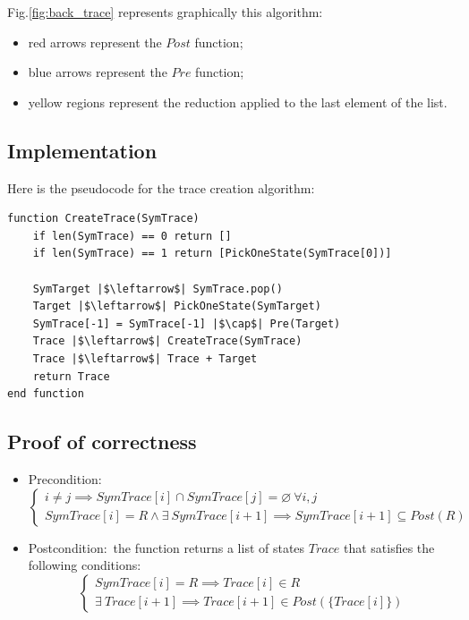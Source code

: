 \documentclass[12pt]{article}
\begin{document}
    Fig.\ref{fig:back_trace} represents graphically this algorithm:
    \begin{itemize}
        \item red arrows represent the $Post$ function;
        \item blue arrows represent the $Pre$ function;
        \item yellow regions represent the reduction applied to the last element of the list.
    \end{itemize}

    \subsection{Implementation}
    Here is the pseudocode for the trace creation algorithm:
    \begin{verbatim}
function CreateTrace(SymTrace)
    if len(SymTrace) == 0 return []
    if len(SymTrace) == 1 return [PickOneState(SymTrace[0])]

    SymTarget |$\leftarrow$| SymTrace.pop()
    Target |$\leftarrow$| PickOneState(SymTarget)
    SymTrace[-1] = SymTrace[-1] |$\cap$| Pre(Target)
    Trace |$\leftarrow$| CreateTrace(SymTrace)
    Trace |$\leftarrow$| Trace + Target
    return Trace
end function
    \end{verbatim}
    
    \subsection{Proof of correctness}
    \begin{itemize}
        \item Precondition:
        \begin{equation}
            \begin{cases}
                i \neq j \implies SymTrace[i] \cap SymTrace[j] = \varnothing\ \forall i, j \\
                SymTrace[i] = R \wedge \exists\ SymTrace[i+1] \implies SymTrace[i+1] \subseteq Post(R)
            \end{cases}
        \end{equation}
        \item Postcondition:\ the function returns a list of states $Trace$ that satisfies the following conditions:
        \begin{equation}
            \begin{cases}
                SymTrace[i] = R \implies Trace[i] \in R \\
                \exists\ Trace[i+1] \implies Trace[i+1] \in Post(\{Trace[i]\})
            \end{cases}
        \end{equation}
    \end{itemize}
\end{document}
